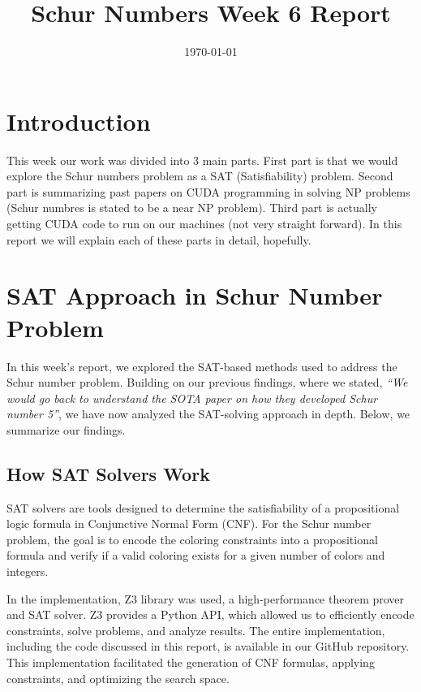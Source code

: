 \documentclass[12pt]{article}
\begin{document}
\title{Schur Numbers Week 6 Report}
\date{\today}

\tableofcontents
\newpage
\maketitle
\section{Introduction}
This week our work was divided into 3 main parts. First part is that we would explore the Schur numbers
problem as a SAT (Satisfiability) problem. Second part is summarizing past papers on CUDA programming 
in solving NP problems (Schur numbres is stated to be a near NP problem). Third part is actually getting 
CUDA code to run on our machines (not very straight forward). In this report we will explain
each of these parts in detail, hopefully.



\section{SAT Approach in Schur Number Problem}

In this week’s report, we explored the SAT-based methods used to address the Schur number problem. Building on our previous findings, where we stated, \textit{“We would go back to understand the SOTA paper on how they developed Schur number 5”}, we have now analyzed the SAT-solving approach in depth. Below, we summarize our findings.

\subsection{How SAT Solvers Work}
SAT solvers are tools designed to determine the satisfiability of a propositional logic formula in Conjunctive Normal Form (CNF). For the Schur number problem, the goal is to encode the coloring constraints into a propositional formula and verify if a valid coloring exists for a given number of colors and integers.


In the implementation, Z3 library was used, a high-performance theorem prover and SAT solver. Z3 provides a Python API, which allowed us to efficiently encode constraints, solve problems, and analyze results. The entire implementation, including the code discussed in this report, is available in our GitHub repository. This implementation facilitated the generation of CNF formulas, applying constraints, and optimizing the search space.
\end{document}

